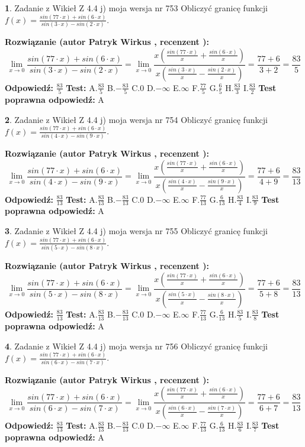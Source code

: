 \documentclass[12pt, a4paper]{article}
\theoremstyle{definition} %
\newtheorem{zad}{}
\newcommand{\zadStart}[1]{\begin{zad}#1\newline}
\newcommand{\zadStop}{\end{zad}}
\newcommand{\rozwStart}[2]{\noindent \textbf{Rozwiązanie (autor #1 , recenzent #2): }\newline}
\newcommand{\rozwStop}{\newline}
\newcommand{\odpStart}{\noindent \textbf{Odpowiedź:}\newline}
\newcommand{\odpStop}{\newline}
\newcommand{\testStart}{\noindent \textbf{Test:}\newline}
\newcommand{\testStop}{\newline}
\newcommand{\kluczStart}{\noindent \textbf{Test poprawna odpowiedź:}\newline}
\newcommand{\kluczStop}{\newline}
\begin{document}
\zadStart{Zadanie z Wikieł Z 4.4 j) moja wersja nr 753}
Obliczyć granicę funkcji $f(x)=\frac{sin(77\cdot x) +sin(6\cdot x)}{sin(3\cdot x) -sin(2\cdot x)}$.
\zadStop
\rozwStart{Patryk Wirkus}{}
$$\lim\limits_{x\to 0}\frac{sin(77\cdot x) +sin(6\cdot x)}{sin(3\cdot x) -sin(2\cdot x)}=\lim\limits_{x\to 0}\frac{x(\frac{sin(77\cdot x)}{x}+\frac{sin(6\cdot x)}{x})}{x(\frac{sin(3\cdot x)}{x}-\frac{sin(2\cdot x)}{x})}=\frac{77+6}{3+2} = \frac{83}{5}$$
\rozwStop
\odpStart
$\frac{83}{5}$
\odpStop
\testStart
A.$\frac{83}{5}$
B.$-\frac{83}{5}$
C.$0$
D.$-\infty$
E.$\infty$
F.$\frac{77}{5}$
G.$\frac{6}{5}$
H.$\frac{83}{3}$
I.$\frac{83}{2}$
\testStop
\kluczStart
A
\kluczStop



\zadStart{Zadanie z Wikieł Z 4.4 j) moja wersja nr 754}
Obliczyć granicę funkcji $f(x)=\frac{sin(77\cdot x) +sin(6\cdot x)}{sin(4\cdot x) -sin(9\cdot x)}$.
\zadStop
\rozwStart{Patryk Wirkus}{}
$$\lim\limits_{x\to 0}\frac{sin(77\cdot x) +sin(6\cdot x)}{sin(4\cdot x) -sin(9\cdot x)}=\lim\limits_{x\to 0}\frac{x(\frac{sin(77\cdot x)}{x}+\frac{sin(6\cdot x)}{x})}{x(\frac{sin(4\cdot x)}{x}-\frac{sin(9\cdot x)}{x})}=\frac{77+6}{4+9} = \frac{83}{13}$$
\rozwStop
\odpStart
$\frac{83}{13}$
\odpStop
\testStart
A.$\frac{83}{13}$
B.$-\frac{83}{13}$
C.$0$
D.$-\infty$
E.$\infty$
F.$\frac{77}{13}$
G.$\frac{6}{13}$
H.$\frac{83}{4}$
I.$\frac{83}{9}$
\testStop
\kluczStart
A
\kluczStop



\zadStart{Zadanie z Wikieł Z 4.4 j) moja wersja nr 755}
Obliczyć granicę funkcji $f(x)=\frac{sin(77\cdot x) +sin(6\cdot x)}{sin(5\cdot x) -sin(8\cdot x)}$.
\zadStop
\rozwStart{Patryk Wirkus}{}
$$\lim\limits_{x\to 0}\frac{sin(77\cdot x) +sin(6\cdot x)}{sin(5\cdot x) -sin(8\cdot x)}=\lim\limits_{x\to 0}\frac{x(\frac{sin(77\cdot x)}{x}+\frac{sin(6\cdot x)}{x})}{x(\frac{sin(5\cdot x)}{x}-\frac{sin(8\cdot x)}{x})}=\frac{77+6}{5+8} = \frac{83}{13}$$
\rozwStop
\odpStart
$\frac{83}{13}$
\odpStop
\testStart
A.$\frac{83}{13}$
B.$-\frac{83}{13}$
C.$0$
D.$-\infty$
E.$\infty$
F.$\frac{77}{13}$
G.$\frac{6}{13}$
H.$\frac{83}{5}$
I.$\frac{83}{8}$
\testStop
\kluczStart
A
\kluczStop



\zadStart{Zadanie z Wikieł Z 4.4 j) moja wersja nr 756}
Obliczyć granicę funkcji $f(x)=\frac{sin(77\cdot x) +sin(6\cdot x)}{sin(6\cdot x) -sin(7\cdot x)}$.
\zadStop
\rozwStart{Patryk Wirkus}{}
$$\lim\limits_{x\to 0}\frac{sin(77\cdot x) +sin(6\cdot x)}{sin(6\cdot x) -sin(7\cdot x)}=\lim\limits_{x\to 0}\frac{x(\frac{sin(77\cdot x)}{x}+\frac{sin(6\cdot x)}{x})}{x(\frac{sin(6\cdot x)}{x}-\frac{sin(7\cdot x)}{x})}=\frac{77+6}{6+7} = \frac{83}{13}$$
\rozwStop
\odpStart
$\frac{83}{13}$
\odpStop
\testStart
A.$\frac{83}{13}$
B.$-\frac{83}{13}$
C.$0$
D.$-\infty$
E.$\infty$
F.$\frac{77}{13}$
G.$\frac{6}{13}$
H.$\frac{83}{6}$
I.$\frac{83}{7}$
\testStop
\kluczStart
A
\kluczStop
\end{document}
